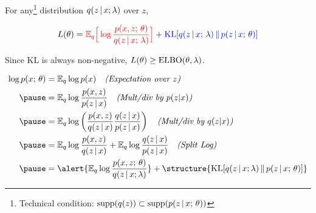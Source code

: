 \begin{frame}

For any\footnote{Technical condition: $\text{supp}(q(z)) \subset \text{supp}(p(z \,|\, x ; \, \theta))$} distribution $q(z\,|\, x; \lambda)$ over $z$, 

\[ L(\theta) = \textcolor{red}{\mathbb{E}_{q}\Big[\log \frac{p(x, z ; \, \theta)}{q(z\,|\, x ; \,\lambda)} \Big]} + \textcolor{blue}{\operatorname*{KL}[q(z\,|\, x ; \, \lambda)  \, \Vert \, p(z \,|\, x ; \, \theta)]}\] 

\begin{center}
\end{center}


Since KL is always non-negative, $L(\theta) \geq \operatorname*{ELBO}(\theta, \lambda)$. 
\end{frame}

\begin{frame}
{\small
\begin{align*}
\log p(x \param \theta) &=\E_{q} \log p(x)  \quad  \text{\it (Expectation over $z$)} \\ \pause
&= \E_{q} \log \frac{p(x, z)}{p(z \given x)} \quad \text{\it (Mult/div by $p(z|x)$)}\\ \pause
&= \E_{q} \log \left( \frac{p(x, z )}{q(z\given x)} \frac{q(z\given x)}{p(z \given x)} \right) \quad \text{\it (Mult/div by $q(z|x)$)}\\ \pause
&= \E_{q} \log \frac{p(x, z )}{q(z\given x )}  + \E_{q}  \log \frac{q(z \given x)}{p(z \given x )}  \quad  \text{\it (Split Log)}\\ \pause
&= \alert{\E_{q}  \log \frac{p(x, z \param \theta)}{q(z\given x;\lambda )}} + \structure{\KL[q(z \given x;\lambda)  \, \Vert \, p(z \given x \param \theta)]}  \\
\end{align*}
}
\end{frame}


